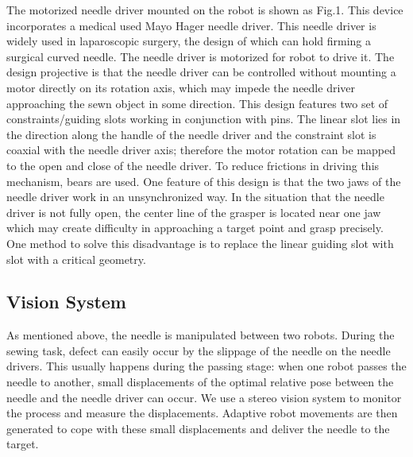 The motorized needle driver mounted on the robot is shown as Fig.1. This device incorporates a medical used Mayo Hager needle driver. This needle driver is widely used in laparoscopic surgery, the design of which can hold firming a surgical curved needle. The needle driver is motorized for robot to drive it. The design projective is that the needle driver can be controlled without mounting a motor directly on its rotation axis, which may impede the needle driver approaching the sewn object in some direction. This design features two set of constraints/guiding slots working in conjunction with pins. The linear slot lies in the direction along the handle of the needle driver and the constraint slot is coaxial with the needle driver axis; therefore the motor rotation can be mapped to the open and close of the needle driver. To reduce frictions in driving this mechanism, bears are used. One feature of this design is that the two jaws of the needle driver work in an unsynchronized way. In the situation that the needle driver is not fully open, the center line of the grasper is located near one jaw which may create difficulty in approaching a target point and grasp precisely. One method to solve this disadvantage is to replace the linear guiding slot with slot with a critical geometry.

\subsection{Vision System}
As mentioned above, the needle is manipulated between two robots. During the sewing task, defect can easily occur by the slippage of the needle on the needle drivers. This usually happens during the passing stage: when one robot passes the needle to another, small displacements of the optimal relative pose between the needle and the needle driver can occur. We use a stereo vision system to monitor the process and measure the displacements. Adaptive robot movements are then generated to cope with these small displacements and deliver the needle to the target.

